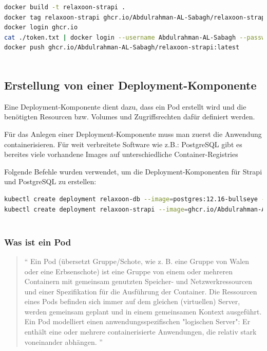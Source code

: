 \begin{lstlisting}[language=bash,caption=Veröffentlichung eines Docker-Images auf GHCR]
docker build -t relaxoon-strapi .
docker tag relaxoon-strapi ghcr.io/Abdulrahman-AL-Sabagh/relaxoon-strapi:latest
docker login ghcr.io
cat ./token.txt | docker login --username Abdulrahman-AL-Sabagh --password-stdin
docker push ghcr.io/Abdulrahman-AL-Sabagh/relaxoon-strapi:latest
    
\end{lstlisting}
\cite{upload-to-ghcr}


\subsection{Erstellung von einer Deployment-Komponente}

Eine Deployment-Komponente dient dazu, dass ein Pod erstellt wird und die benötigten Resourcen bzw. Volumes und Zugriffsrechten
dafür definiert werden.\cite{k8s-deployment}

Für das Anlegen einer Deployment-Komponente muss man zuerst die Anwendung containerisieren.
Für weit verbreitete Software wie z.B.: PostgreSQL gibt es bereites viele vorhandene Images auf unterschiedliche Container-Registries

Folgende Befehle wurden verwendet, um die Deployment-Komponenten für Strapi und PostgreSQL zu erstellen:

\begin{lstlisting}[language=bash, caption=create k8s deployments]
kubectl create deployment relaxoon-db --image=postgres:12.16-bullseye --port=5432
kubectl create deployment relaxoon-strapi --image=ghcr.io/Abdulrahman-AL-Sabagh/relaxoon-strapi:latest --port=8080
    
\end{lstlisting}


\subsubsection{Was ist ein Pod}

\begin{quotation}
  ``
  Ein Pod (übersetzt Gruppe/Schote, wie z. B. eine Gruppe von Walen oder eine Erbsenschote)
  ist eine Gruppe von einem oder mehreren Containern mit gemeinsam genutzten Speicher- und
  Netzwerkressourcen und einer Spezifikation für die Ausführung der Container.
  Die Ressourcen eines Pods befinden sich immer auf dem gleichen (virtuellen) Server,
  werden gemeinsam geplant und in einem gemeinsamen Kontext ausgeführt.
  Ein Pod modelliert einen anwendungsspezifischen "logischen Server": Er enthält eine oder mehrere
  containerisierte Anwendungen, die relativ stark voneinander abhängen.
  ''
  \cite{pod}
\end{quotation}






